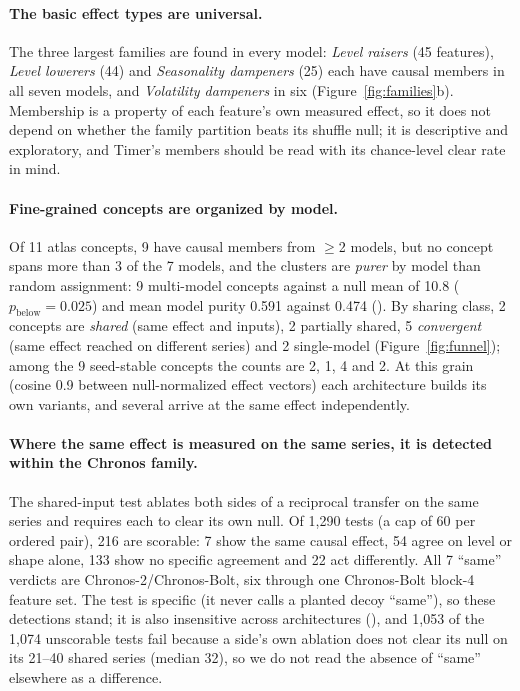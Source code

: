 \paragraph{The basic effect types are universal.} The three largest families are found in every model: \emph{Level
raisers} (45 features), \emph{Level lowerers} (44) and \emph{Seasonality dampeners} (25) each have causal members in all
seven models, and \emph{Volatility dampeners} in six (Figure~\ref{fig:families}b). Membership is a property of each
feature's own measured effect, so it does not depend on whether the family partition beats its shuffle null; it is
descriptive and exploratory, and Timer's members should be read with its chance-level clear rate in mind.

\paragraph{Fine-grained concepts are organized by model.} Of 11 atlas concepts, 9 have causal members from $\ge$2 models,
but no concept spans more than 3 of the 7 models, and the clusters are \emph{purer} by model than random assignment: 9
multi-model concepts against a null mean of 10.8 ($p_{\text{below}}=0.025$) and mean model purity 0.591 against 0.474
(). By sharing class, 2 concepts are \emph{shared} (same effect and inputs), 2 partially shared, 5
\emph{convergent} (same effect reached on different series) and 2 single-model (Figure~\ref{fig:funnel}); among the 9
seed-stable concepts the counts are 2, 1, 4 and 2. At this grain (cosine 0.9 between null-normalized effect
vectors) each architecture builds its own variants, and several arrive at the same effect independently.

\paragraph{Where the same effect is measured on the same series, it is detected within the Chronos family.} The
shared-input test ablates both sides of a reciprocal transfer on the same series and requires each to clear its own null.
Of 1{,}290 tests (a cap of 60 per ordered pair), 216 are scorable: 7 show the same causal effect, 54 agree on level or
shape alone, 133 show no specific agreement and 22 act differently. All 7 ``same'' verdicts are Chronos-2/Chronos-Bolt,
six through one Chronos-Bolt block-4 feature set. The test is specific (it never calls a planted decoy ``same''), so these
detections stand; it is also insensitive across architectures (), and 1{,}053 of the 1{,}074 unscorable
tests fail because a side's own ablation does not clear its null on its 21--40 shared series (median 32), so we do not read the
absence of ``same'' elsewhere as a difference.


